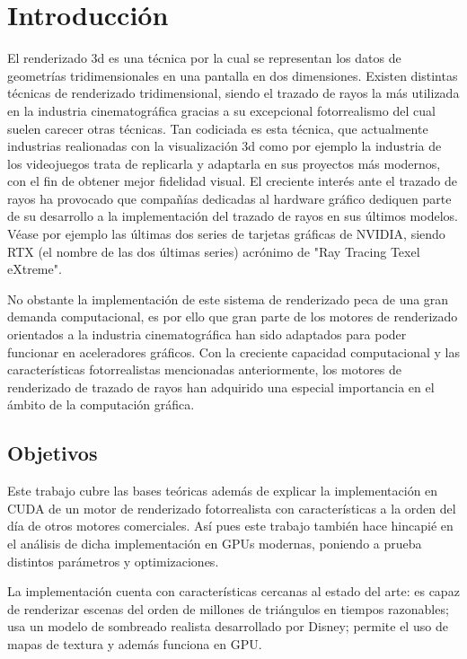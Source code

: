 \chapter{Introducción}
	
El renderizado 3d es una técnica por la cual se representan los datos de geometrías tridimensionales en una pantalla en dos dimensiones. Existen distintas técnicas de renderizado tridimensional, siendo el trazado de rayos la más utilizada en la industria cinematográfica gracias a su excepcional fotorrealismo del cual suelen carecer otras técnicas. Tan codiciada es esta técnica, que actualmente industrias realionadas con la visualización 3d como por ejemplo la industria de los videojuegos trata de replicarla y adaptarla en sus proyectos más modernos, con el fin de obtener mejor fidelidad visual.
El creciente interés ante el trazado de rayos ha provocado que compañías dedicadas al hardware gráfico dediquen parte de su desarrollo a la implementación del trazado de rayos en sus últimos modelos. Véase por ejemplo las últimas dos series de tarjetas gráficas de NVIDIA, siendo RTX (el nombre de las dos últimas series) acrónimo de "Ray Tracing Texel eXtreme". 

No obstante la implementación de este sistema de renderizado peca de una gran demanda computacional, es por ello que gran parte de los motores de renderizado orientados a la industria cinematográfica han sido adaptados para poder funcionar en aceleradores gráficos. Con la creciente capacidad computacional y las características fotorrealistas mencionadas anteriormente, los motores de renderizado de trazado de rayos han adquirido una especial importancia en el ámbito de la computación gráfica.



\section{Objetivos}

Este trabajo cubre las bases teóricas además de explicar la implementación en CUDA de un motor de renderizado fotorrealista con características a la orden del día de otros motores comerciales. Así pues este trabajo también hace hincapié en el análisis de dicha implementación en GPUs modernas, poniendo a prueba distintos parámetros y optimizaciones.

La implementación cuenta con características cercanas al estado del arte: es capaz de renderizar escenas del orden de millones de triángulos en tiempos razonables; usa un modelo de sombreado realista desarrollado por Disney; permite el uso de mapas de textura y además funciona en GPU.

